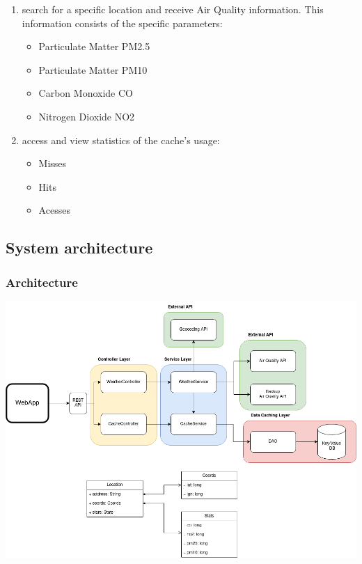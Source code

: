 \documentclass[12pt]{article}
\begin{document}
\begin{enumerate}

\item  search for a specific location and receive Air Quality information. This information consists of the specific parameters: 
	\begin{itemize}
		\item Particulate Matter PM2.5
		\item Particulate Matter PM10
		\item Carbon Monoxide CO
		\item Nitrogen Dioxide NO2
	\end{itemize}
	
\item access and view statistics of the cache's usage:
	\begin{itemize}
		\item Misses
		\item Hits
		\item Acesses
	\end{itemize}

\end{enumerate}


\subsection{System architecture}

\subsubsection{Architecture}

\includegraphics[scale=.4]{architecture.png}
\end{document}
